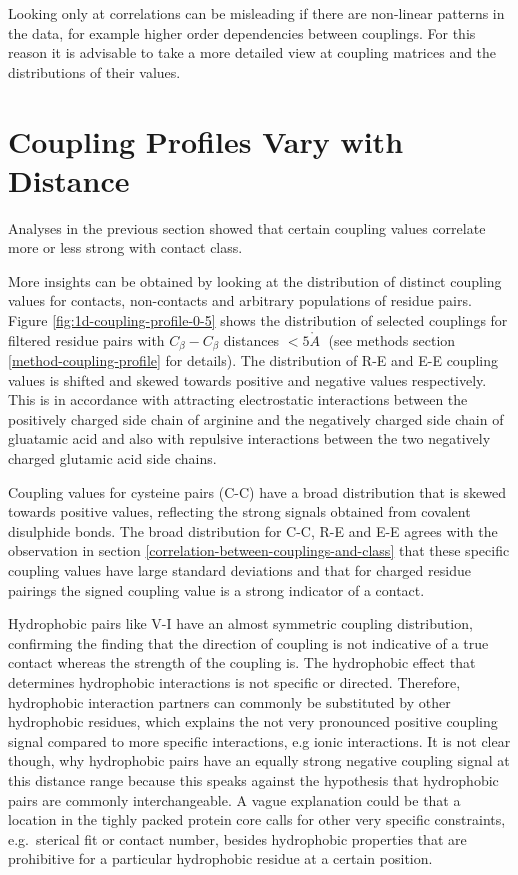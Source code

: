 \documentclass[11pt,a4paper,twoside]{book}
\newcommand{\Cb}{C_\beta}
\newcommand{\angstrom}{\mathring{A} \;}
\theoremstyle{definition}
\theoremstyle{definition}
\theoremstyle{remark}
\begin{document}
Looking only at correlations can be misleading if there are non-linear
patterns in the data, for example higher order dependencies between
couplings. For this reason it is advisable to take a more detailed view
at coupling matrices and the distributions of their values.

\section{Coupling Profiles Vary with Distance}\label{coupling-profiles}

Analyses in the previous section showed that certain coupling values
correlate more or less strong with contact class.

More insights can be obtained by looking at the distribution of distinct
coupling values for contacts, non-contacts and arbitrary populations of
residue pairs. Figure \ref{fig:1d-coupling-profile-0-5} shows the
distribution of selected couplings for filtered residue pairs with
\(\Cb-\Cb\) distances \(< 5\angstrom\) (see methods section
\ref{method-coupling-profile} for details). The distribution of R-E and
E-E coupling values is shifted and skewed towards positive and negative
values respectively. This is in accordance with attracting electrostatic
interactions between the positively charged side chain of arginine and
the negatively charged side chain of gluatamic acid and also with
repulsive interactions between the two negatively charged glutamic acid
side chains.

Coupling values for cysteine pairs (C-C) have a broad distribution that
is skewed towards positive values, reflecting the strong signals
obtained from covalent disulphide bonds. The broad distribution for C-C,
R-E and E-E agrees with the observation in section
\ref{correlation-between-couplings-and-class} that these specific
coupling values have large standard deviations and that for charged
residue pairings the signed coupling value is a strong indicator of a
contact.

Hydrophobic pairs like V-I have an almost symmetric coupling
distribution, confirming the finding that the direction of coupling is
not indicative of a true contact whereas the strength of the coupling
is. The hydrophobic effect that determines hydrophobic interactions is
not specific or directed. Therefore, hydrophobic interaction partners
can commonly be substituted by other hydrophobic residues, which
explains the not very pronounced positive coupling signal compared to
more specific interactions, e.g ionic interactions. It is not clear
though, why hydrophobic pairs have an equally strong negative coupling
signal at this distance range because this speaks against the hypothesis
that hydrophobic pairs are commonly interchangeable. A vague explanation
could be that a location in the tighly packed protein core calls for
other very specific constraints, e.g.~sterical fit or contact number,
besides hydrophobic properties that are prohibitive for a particular
hydrophobic residue at a certain position.
\end{document}
